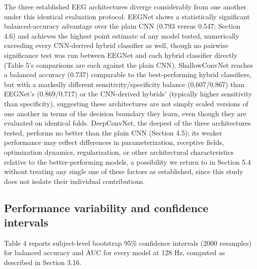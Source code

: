 \documentclass[a4paper,fleqn]{cas-sc}
\begin{document}
The three established EEG architectures diverge considerably from one another under this identical evaluation protocol. EEGNet shows a statistically significant balanced-accuracy advantage over the plain CNN (0.793 versus 0.547; Section 4.6) and achieves the highest point estimate of any model tested, numerically exceeding every CNN-derived hybrid classifier as well, though no pairwise significance test was run between EEGNet and each hybrid classifier directly (Table 5's comparisons are each against the plain CNN). ShallowConvNet reaches a balanced accuracy (0.737) comparable to the best-performing hybrid classifiers, but with a markedly different sensitivity/specificity balance (0.607/0.867) than EEGNet's (0.869/0.717) or the CNN-derived hybrids' (typically higher sensitivity than specificity), suggesting these architectures are not simply scaled versions of one another in terms of the decision boundary they learn, even though they are evaluated on identical folds. DeepConvNet, the deepest of the three architectures tested, performs no better than the plain CNN (Section 4.5); its weaker performance may reflect differences in parameterization, receptive fields, optimization dynamics, regularization, or other architectural characteristics relative to the better-performing models, a possibility we return to in Section 5.4 without treating any single one of these factors as established, since this study does not isolate their individual contributions.



\subsection{Performance variability and confidence intervals}

Table 4 reports subject-level bootstrap 95\% confidence intervals (2000 resamples) for balanced accuracy and AUC for every model at 128 Hz, computed as described in Section 3.16.
\end{document}
